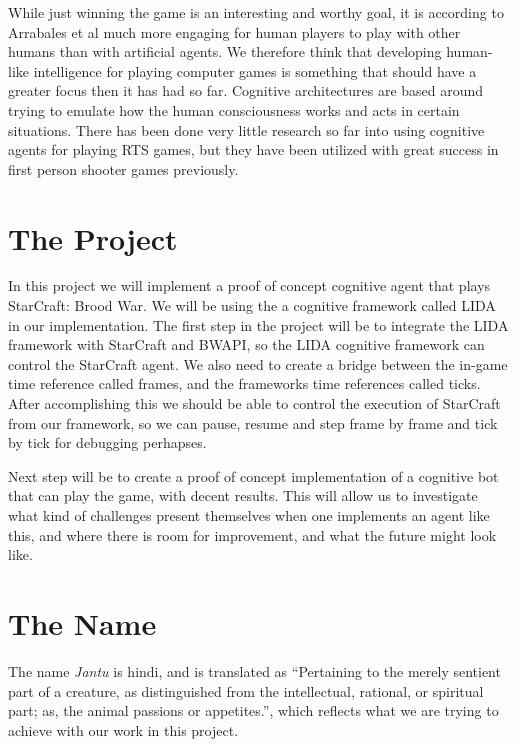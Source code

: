 While just winning the game is an interesting and worthy goal, it is according to Arrabales et al much more engaging for human players to play with other humans than with artificial agents.\cite{arrabales2009gamechars} We therefore think that developing human-like intelligence for playing computer games is something that should have a greater focus then it has had so far. Cognitive architectures are based around trying to emulate how the human consciousness works and acts in certain situations. There has been done very little research so far into using cognitive agents for playing RTS games, but they have been utilized with great success in first person shooter games previously.\cite{arrabales2009gamechars}

\section{The Project}
In this project we will implement a proof of concept cognitive agent that plays StarCraft: Brood War. We will be using the a cognitive framework called LIDA in our implementation. The first step in the project will be to integrate the LIDA framework with StarCraft and BWAPI, so the LIDA cognitive framework can control the StarCraft agent. We also need to create a bridge between the in-game time reference called frames, and the frameworks time references called ticks. After accomplishing this we should be able to control the execution of StarCraft from our framework, so we can pause, resume and step frame by frame and tick by tick for debugging perhapses.

Next step will be to create a proof of concept implementation of a cognitive bot that can play the game, with decent results. This will allow us to investigate what kind of challenges present themselves when one implements an agent like this, and where there is room for improvement, and what the future might look like.

\section{The Name}
\label{sec:name}
The name {\em Jantu} is hindi, and is translated as ``Pertaining to the merely sentient part of a creature, as distinguished from the intellectual, rational, or spiritual part; as, the animal passions or appetites.''\cite{hindijantu}, which reflects what we are trying to achieve with our work in this project.

